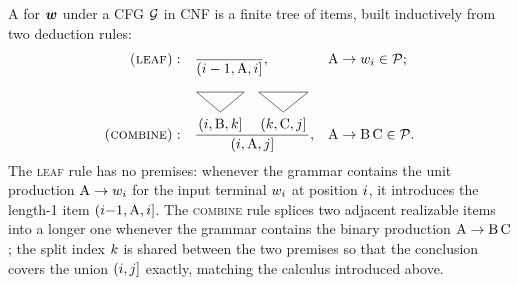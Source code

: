 \documentclass{article}
\begin{document}
A  for ${{\boldsymbol{w}}}$ under a CFG ${{ \mathcal{G}}}$ in CNF is a finite tree of items, built inductively from two deduction rules:
\begin{align*}
    \textsc{(leaf)}:\quad
    & \dfrac{}{(\idxi - 1, \NTA, \idxi]},
    &&  \production{\NTA}{\sym_\idxi} \in \rules; \\[0.7em]
    \textsc{(combine)}:\quad
    & \dfrac{%
    \tikz[baseline=(b.base)]{%
    \node[inner sep=1pt] (b) {$(\idxi, \NTB, \idxk]$};%
    \draw ([yshift=6mm]b.north west) -- ([yshift=6mm]b.north east) -- ([yshift=1mm]b.north) -- cycle;%
    }%
    \quad
    \tikz[baseline=(c.base)]{%
    \node[inner sep=1pt] (c) {$(\idxk, \NTC, \idxj]$};%
    \draw ([yshift=6mm]c.north west) -- ([yshift=6mm]c.north east) -- ([yshift=1mm]c.north) -- cycle;%
    }%
    }{(\idxi, \NTA, \idxj]},
    &&  \production{\NTA}{\NTB\,\NTC} \in \rules.
\end{align*}
The \textsc{leaf} rule has no premises: whenever the grammar contains the unit production ${{ {{ \mathrm{A}}} \rightarrow {w}_{{ i}}}}$ for the input terminal ${w}_{{ i}}$ at position ${{ i}}$, it introduces the length-1 item $({{ i}}{-}1, {{ \mathrm{A}}}, {{ i}}]$. The \textsc{combine} rule splices two adjacent realizable items into a longer one whenever the grammar contains the binary production ${{ {{ \mathrm{A}}} \rightarrow {{ \mathrm{B}}}\,{{ \mathrm{C}}}}}$; the split index ${{ k}}$ is shared between the two premises so that the conclusion covers the union $({{ i}}, {{ j}}]$ exactly, matching the calculus introduced above. 
\end{document}
